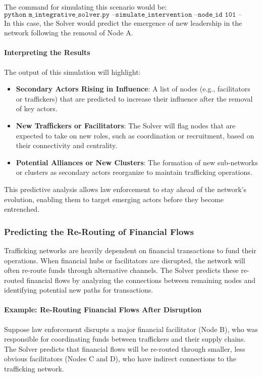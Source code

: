 \documentclass[%
 preprint, linenumbers,
 amsmath,amssymb,
 aps, physrev,
]{revtex4-2}
\begin{document}
The command for simulating this scenario would be:
\[
\texttt{python m\_integrative\_solver.py --simulate\_intervention --node\_id 101 --predict\_adaptation}
\]
In this case, the Solver would predict the emergence of new leadership in the network following the removal of Node A.

\paragraph{Interpreting the Results}

The output of this simulation will highlight:
\begin{itemize}
    \item \textbf{Secondary Actors Rising in Influence}: A list of nodes (e.g., facilitators or traffickers) that are predicted to increase their influence after the removal of key actors.
    \item \textbf{New Traffickers or Facilitators}: The Solver will flag nodes that are expected to take on new roles, such as coordination or recruitment, based on their connectivity and centrality.
    \item \textbf{Potential Alliances or New Clusters}: The formation of new sub-networks or clusters as secondary actors reorganize to maintain trafficking operations.
\end{itemize}

This predictive analysis allows law enforcement to stay ahead of the network’s evolution, enabling them to target emerging actors before they become entrenched.

\subsubsection{Predicting the Re-Routing of Financial Flows}

Trafficking networks are heavily dependent on financial transactions to fund their operations. When financial hubs or facilitators are disrupted, the network will often re-route funds through alternative channels. The Solver predicts these re-routed financial flows by analyzing the connections between remaining nodes and identifying potential new paths for transactions.

\paragraph{Example: Re-Routing Financial Flows After Disruption}

Suppose law enforcement disrupts a major financial facilitator (Node B), who was responsible for coordinating funds between traffickers and their supply chains. The Solver predicts that financial flows will be re-routed through smaller, less obvious facilitators (Nodes C and D), who have indirect connections to the trafficking network.
\end{document}
